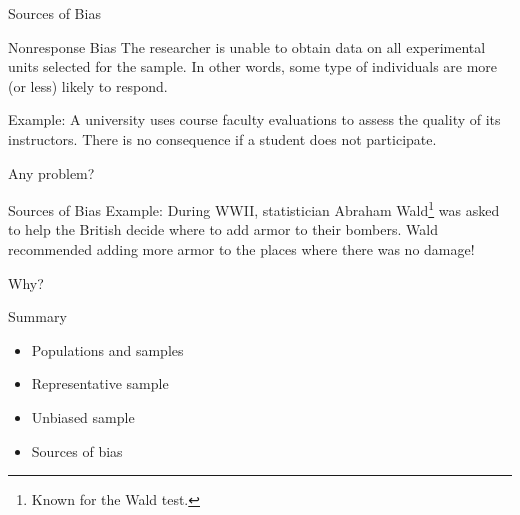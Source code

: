 \documentclass{beamer}
\begin{document}
\begin{frame}{Sources of Bias}
\begin{block}{Nonresponse Bias}
The researcher is unable to obtain data on all experimental units selected for the sample. In other words, some type of individuals are more (or less) likely to respond. 
\end{block}
Example: A university uses course faculty evaluations to assess the quality of its instructors.  There is no consequence if a student does not participate.

Any problem?
\end{frame}

\begin{frame}{Sources of Bias}
Example: During WWII, statistician Abraham Wald\footnote{Known for the Wald test.} was asked to help the British decide where to add armor to their bombers. Wald recommended adding more armor to the places where there was no damage! 

Why?
\end{frame}


\begin{frame}{Summary}
\begin{itemize}
\item Populations and samples
\item Representative sample
\item Unbiased sample
\item Sources of bias
\end{itemize}

\end{frame}
\end{document}
